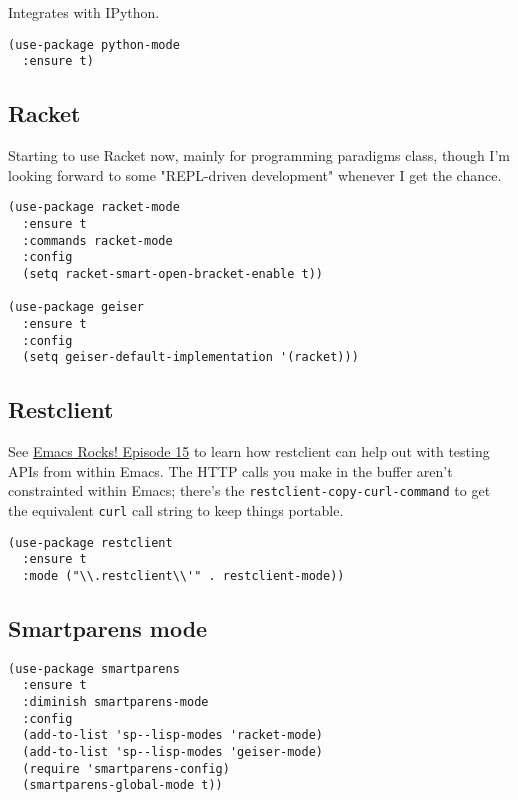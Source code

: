 \documentclass[11pt]{article}
\begin{document}
Integrates with IPython.

\begin{verbatim}
(use-package python-mode
  :ensure t)
\end{verbatim}

\subsection{Racket}
\label{sec-18-25}

Starting to use Racket now, mainly for programming paradigms class,
though I'm looking forward to some "REPL-driven development" whenever
I get the chance.

\begin{verbatim}
(use-package racket-mode
  :ensure t
  :commands racket-mode
  :config
  (setq racket-smart-open-bracket-enable t))

(use-package geiser
  :ensure t
  :config
  (setq geiser-default-implementation '(racket)))
\end{verbatim}

\subsection{Restclient}
\label{sec-18-26}

See \href{http://emacsrocks.com/e15.html}{Emacs Rocks! Episode 15} to learn how restclient can help out with
testing APIs from within Emacs. The HTTP calls you make in the buffer
aren't constrainted within Emacs; there's the
\texttt{restclient-copy-curl-command} to get the equivalent \texttt{curl} call
string to keep things portable.

\begin{verbatim}
(use-package restclient
  :ensure t
  :mode ("\\.restclient\\'" . restclient-mode))
\end{verbatim}

\subsection{Smartparens mode}
\label{sec-18-27}

\begin{verbatim}
(use-package smartparens
  :ensure t
  :diminish smartparens-mode
  :config
  (add-to-list 'sp--lisp-modes 'racket-mode)
  (add-to-list 'sp--lisp-modes 'geiser-mode)
  (require 'smartparens-config)
  (smartparens-global-mode t))
\end{verbatim}
\end{document}
